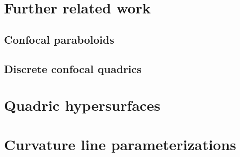 \documentclass[12pt,a4paper]{article}
\theoremstyle{BoldTopSpacing}
\theoremstyle{BoldTopSpacing}
\theoremstyle{BoldTopSpacing}
\theoremstyle{BoldTopBottomSpacing}
\theoremstyle{BoldTopSpacing}
\theoremstyle{BoldTopBottomSpacing}
\theoremstyle{remark}
\begin{document}
\section{Further related work}
\label{sec:further-related-work}
\subsection{Confocal paraboloids}
\label{subsec:confocal-paraboloids}
\subsection{Discrete confocal quadrics}
\label{subsec:discrete-confocal-quadrics}
\pagebreak
\appendix
\section{Quadric hypersurfaces}
\label{appendix:quadrics}
\pagebreak
\section{Curvature line parameterizations}
\label{appendix:curvature-lines}
\pagebreak


\pagestyle{tocstyle}


\end{document}
